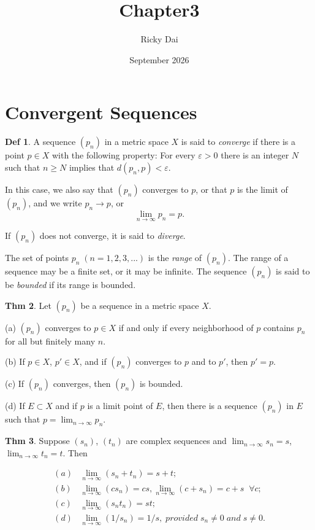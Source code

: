 \documentclass{article}
\title{Chapter3}
\author{Ricky Dai}
\date{September 2026}
\theoremstyle{definition}
\newtheorem{definition}{Def}
\newtheorem{theorem}[definition]{Thm}
\begin{document}
\maketitle
\section{Convergent Sequences}
\begin{definition}
    A sequence $(p_n)$ in a metric space $X$ is said to \textit{converge} if there is a point $p\in X$ with the following property: For every $\varepsilon>0$ there is an integer $N$ such that $n\geq N$ implies that $d(p_n,p)<\varepsilon$.\par
    In this case, we also say that $(p_n)$ converges to $p$, or that $p$ is the limit of $(p_n)$, and we write $p_n\to p$, or
    \[
    \lim_{n\to\infty} p_n = p.
    \]\par
    If $(p_n)$ does not converge, it is said to \textit{diverge}.\par
    The set of points $p_n\;(n=1,2,3,...)$ is the \textit{range} of $(p_n)$. The range of a sequence may be a finite set, or it may be infinite. The sequence $(p_n)$ is said to be \textit{bounded} if its range is bounded.
\end{definition}
\begin{theorem}
    Let $(p_n)$ be a sequence in a metric space $X$.\par
    (a) $(p_n)$ converges to $p\in X$ if and only if every neighborhood of $p$ contains $p_n$ for all but finitely many $n$.\par
    (b) If $p\in X$, $p'\in X$, and if $(p_n)$ converges to $p$ and to $p'$, then $p'=p$.\par
    (c) If $(p_n)$ converges, then $(p_n)$ is bounded.\par
    (d) If $E\subset X$ and if $p$ is a limit point of $E$, then there is a sequence $(p_n)$ in $E$ such that $p=\lim_{n\to\infty}p_n$.
\end{theorem}
\begin{theorem}
    Suppose $(s_n)$, $(t_n)$ are complex sequences and $\lim_{n\to\infty}s_n=s$, $\lim_{n\to\infty}t_n=t$. Then\par
    \[
    \begin{aligned}
        (a)&\lim_{n\to\infty}(s_n+t_n)=s+t;\\
        (b)&\lim_{n\to\infty}(cs_n)=cs,\lim_{n\to\infty}(c+s_n)=c+s\;\;\forall c;\\
        (c)&\lim_{n\to\infty}(s_nt_n)=st;\\
        (d)&\lim_{n\to\infty}(1/s_n)=1/s,\;provided\;s_n\neq 0\;and\;s\neq 0.
    \end{aligned}
    \]
\end{theorem}
\end{document}
